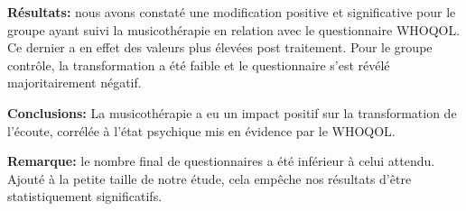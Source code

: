   
  \textbf{Résultats:} nous avons constaté une modification positive et significative pour le groupe ayant 
  suivi la 
  musicothérapie en relation avec le questionnaire WHOQOL. Ce dernier a en effet des valeurs plus 
  élevées 
  post traitement. 
  Pour le groupe contrôle, la transformation a été faible et le questionnaire s'est révélé majoritairement 
  négatif.
  
  
  \textbf{Conclusions:} La musicothérapie a eu un impact positif sur la transformation de l'écoute, 
  corrélée 
  à l'état psychique mis en évidence par le WHOQOL.
  
  
  \textbf{Remarque:} le nombre final de questionnaires a été 
  inférieur à celui attendu. Ajouté à la petite taille de notre étude, cela empêche nos résultats d'être 
  statistiquement significatifs.


	







